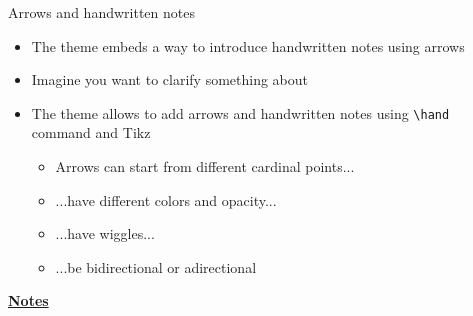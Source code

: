 \documentclass[10pt]{beamer}
\begin{document}
\begin{frame}[t]
    {Arrows and handwritten notes}\bigskip
    \begin{itemize}
        \item The theme embeds a way to introduce handwritten notes using arrows \bigskip\medskip
        \item Imagine you want to clarify something about  \bigskip\medskip
       \item The theme allows to add arrows and handwritten notes using \texttt{\textbackslash hand} command and Tikz \medskip
        \begin{itemize}
            \item Arrows can start from different cardinal points... \medskip
            \item ...have different colors and opacity... \medskip
            \item ...have wiggles... \medskip
            \item ...be bidirectional or adirectional
        \end{itemize}
    \end{itemize}
\end{frame}
\begin{flushleft}
    \underline{\textbf{Notes}}\setlength{\parskip}{.15cm}\notesize\newline\par
\end{flushleft}
\end{document}
